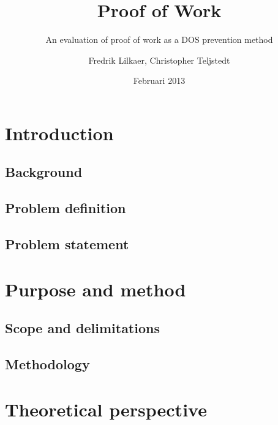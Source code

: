 \documentclass[a4paper,11pt]{kth-mag}
\title{Proof of Work}
\subtitle{An evaluation of proof of work as a DOS prevention method}
\author{Fredrik Lilkaer, Christopher Teljstedt}
\date{Februari 2013}
\begin{document}
\removepagenumbers
\maketitle
{}
\chapter{Introduction}

\section{Background}

\section{Problem definition}

\section{Problem statement} %

\chapter{Purpose and method}

\section{Scope and delimitations}

\section{Methodology}


\chapter{Theoretical perspective}



\begin{comment}
\begin{figure}[ht]
\begin{center}
And here is a figure
\caption{\small{Several statements describing the same resource.}}\label{RDF_4}
\end{center}
\end{figure}


that we refer to here: \ref{RDF_4}
\end{comment}
\end{document}
